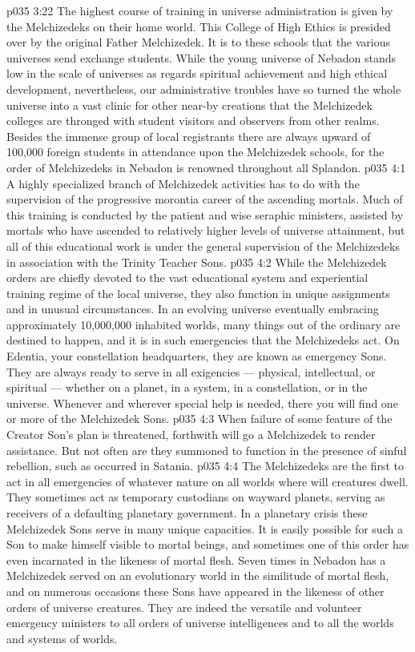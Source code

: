 \vs p035 3:22 The highest course of training in universe administration is given by the Melchizedeks on their home world. This College of High Ethics is presided over by the original Father Melchizedek. It is to these schools that the various universes send exchange students. While the young universe of Nebadon stands low in the scale of universes as regards spiritual achievement and high ethical development, nevertheless, our administrative troubles have so turned the whole universe into a vast clinic for other near\hyp{}by creations that the Melchizedek colleges are thronged with student visitors and observers from other realms. Besides the immense group of local registrants there are always upward of 100,000 foreign students in attendance upon the Melchizedek schools, for the order of Melchizedeks in Nebadon is renowned throughout all Splandon.
\vs p035 4:1 A highly specialized branch of Melchizedek activities has to do with the supervision of the progressive morontia career of the ascending mortals. Much of this training is conducted by the patient and wise seraphic ministers, assisted by mortals who have ascended to relatively higher levels of universe attainment, but all of this educational work is under the general supervision of the Melchizedeks in association with the Trinity Teacher Sons.
\vs p035 4:2 \pc While the Melchizedek orders are chiefly devoted to the vast educational system and experiential training regime of the local universe, they also function in unique assignments and in unusual circumstances. In an evolving universe eventually embracing approximately 10,000,000 inhabited worlds, many things out of the ordinary are destined to happen, and it is in such emergencies that the Melchizedeks act. On Edentia, your constellation headquarters, they are known as emergency Sons. They are always ready to serve in all exigencies --- physical, intellectual, or spiritual --- whether on a planet, in a system, in a constellation, or in the universe. Whenever and wherever special help is needed, there you will find one or more of the Melchizedek Sons.
\vs p035 4:3 When failure of some feature of the Creator Son’s plan is threatened, forthwith will go a Melchizedek to render assistance. But not often are they summoned to function in the presence of sinful rebellion, such as occurred in Satania.
\vs p035 4:4 The Melchizedeks are the first to act in all emergencies of whatever nature on all worlds where will creatures dwell. They sometimes act as temporary custodians on wayward planets, serving as receivers of a defaulting planetary government. In a planetary crisis these Melchizedek Sons serve in many unique capacities. It is easily possible for such a Son to make himself visible to mortal beings, and sometimes one of this order has even incarnated in the likeness of mortal flesh. Seven times in Nebadon has a Melchizedek served on an evolutionary world in the similitude of mortal flesh, and on numerous occasions these Sons have appeared in the likeness of other orders of universe creatures. They are indeed the versatile and volunteer emergency ministers to all orders of universe intelligences and to all the worlds and systems of worlds.
